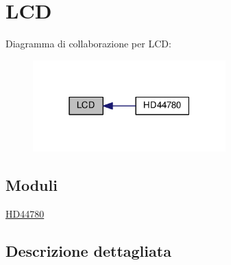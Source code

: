 \hypertarget{group___l_c_d}{\section{L\+C\+D}
\label{group___l_c_d}
}
Diagramma di collaborazione per L\+C\+D\+:
\nopagebreak
\begin{figure}[H]
\begin{center}
\leavevmode
\includegraphics[width=211pt]{group___l_c_d}
\end{center}
\end{figure}
\subsection*{Moduli}
\begin{DoxyCompactItemize}
\item 
\hyperlink{group___h_d44780}{H\+D44780}
\end{DoxyCompactItemize}


\subsection{Descrizione dettagliata}
